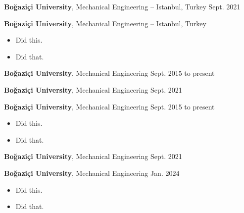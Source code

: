 \documentclass[10pt, letterpaper]{article}
\newenvironment{highlights}{
        \begin{itemize}[
                topsep=0pt,
                partopsep=0pt,
                itemsep=0pt,
                leftmargin=10pt
            ]
    }{
        \end{itemize}
    } %
\begin{document}
        \vspace{8pt}

        \textbf{Boğaziçi University}, Mechanical Engineering -- Istanbul, Turkey \hfill Sept. 2021



        \vspace{8pt}

        \textbf{Boğaziçi University}, Mechanical Engineering -- Istanbul, Turkey \hfill 

        \begin{highlights}
        \item Did this.
        \item Did that.
        \end{highlights}


        \vspace{8pt}

        \textbf{Boğaziçi University}, Mechanical Engineering \hfill Sept. 2015 to present



        \vspace{8pt}

        \textbf{Boğaziçi University}, Mechanical Engineering \hfill Sept. 2021



        \vspace{8pt}

        \textbf{Boğaziçi University}, Mechanical Engineering \hfill Sept. 2015 to present

        \begin{highlights}
        \item Did this.
        \item Did that.
        \end{highlights}


        \vspace{8pt}

        \textbf{Boğaziçi University}, Mechanical Engineering \hfill Sept. 2021



        \vspace{8pt}

        \textbf{Boğaziçi University}, Mechanical Engineering \hfill Jan. 2024

        \begin{highlights}
        \item Did this.
        \item Did that.
        \end{highlights}
\end{document}
